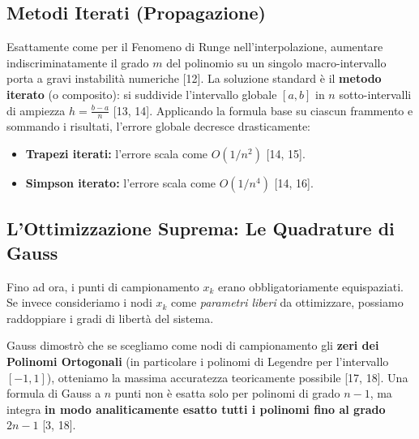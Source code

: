 \documentclass[12pt,a4paper]{article}
\begin{document}
\subsection{Metodi Iterati (Propagazione)}
Esattamente come per il Fenomeno di Runge nell'interpolazione, aumentare indiscriminatamente il grado $m$ del polinomio su un singolo macro-intervallo porta a gravi instabilità numeriche [12]. 
La soluzione standard è il \textbf{metodo iterato} (o composito): si suddivide l'intervallo globale $[a,b]$ in $n$ sotto-intervalli di ampiezza $h = \frac{b-a}{n}$ [13, 14]. Applicando la formula base su ciascun frammento e sommando i risultati, l'errore globale decresce drasticamente:
\begin{itemize}
    \item \textbf{Trapezi iterati:} l'errore scala come $O(1/n^2)$ [14, 15].
    \item \textbf{Simpson iterato:} l'errore scala come $O(1/n^4)$ [14, 16].
\end{itemize}

\subsection{L'Ottimizzazione Suprema: Le Quadrature di Gauss}
Fino ad ora, i punti di campionamento $x_k$ erano obbligatoriamente equispaziati. Se invece consideriamo i nodi $x_k$ come \textit{parametri liberi} da ottimizzare, possiamo raddoppiare i gradi di libertà del sistema. 

Gauss dimostrò che se scegliamo come nodi di campionamento gli \textbf{zeri dei Polinomi Ortogonali} (in particolare i polinomi di Legendre per l'intervallo $[-1, 1]$), otteniamo la massima accuratezza teoricamente possibile [17, 18]. 
Una formula di Gauss a $n$ punti non è esatta solo per polinomi di grado $n-1$, ma integra \textbf{in modo analiticamente esatto tutti i polinomi fino al grado $2n - 1$} [3, 18].
\end{document}
